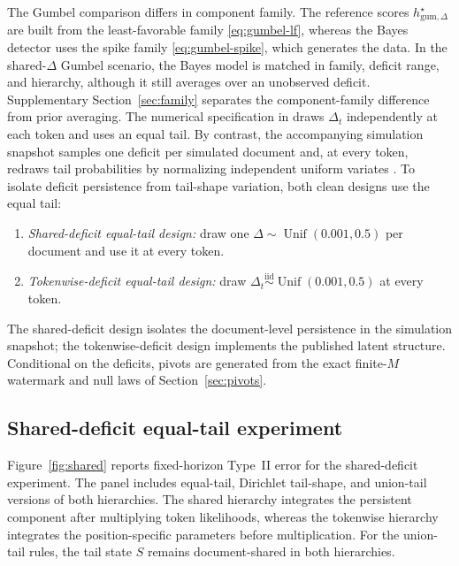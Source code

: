 \documentclass[11pt]{article}
\newcommand{\Unif}{\operatorname{Unif}}
\begin{document}
The Gumbel comparison differs in component family.  The reference scores $h_{\mathrm{gum},\Delta}^\star$ are built from the least-favorable family \eqref{eq:gumbel-lf}, whereas the Bayes detector uses the spike family \eqref{eq:gumbel-spike}, which generates the data.  In the shared-$\Delta$ Gumbel scenario, the Bayes model is matched in family, deficit range, and hierarchy, although it still averages over an unobserved deficit.  Supplementary Section~\ref{sec:family} separates the component-family difference from prior averaging.  The numerical specification in \citet{li2025framework} draws $\Delta_t$ independently at each token and uses an equal tail.  By contrast, the accompanying simulation snapshot samples one deficit per simulated document and, at every token, redraws tail probabilities by normalizing independent uniform variates \citep{li2024watermarkframework}.  To isolate deficit persistence from tail-shape variation, both clean designs use the equal tail:
\begin{enumerate}
  \setlength{\itemsep}{0pt}
  \setlength{\parsep}{0pt}
  \item \emph{Shared-deficit equal-tail design:} draw one $\Delta\sim\Unif(0.001,0.5)$ per document and use it at every token.
  \item \emph{Tokenwise-deficit equal-tail design:} draw $\Delta_t\stackrel{\mathrm{iid}}{\sim}\Unif(0.001,0.5)$ at every token.
\end{enumerate}
The shared-deficit design isolates the document-level persistence in the simulation snapshot; the tokenwise-deficit design implements the published latent structure.  Conditional on the deficits, pivots are generated from the exact finite-$M$ watermark and null laws of Section~\ref{sec:pivots}.

\FloatBarrier
\subsection{Shared-deficit equal-tail experiment}
\label{sec:shared-sensitivity}

Figure~\ref{fig:shared} reports fixed-horizon Type~II error for the shared-deficit experiment.  The panel includes equal-tail, Dirichlet tail-shape, and union-tail versions of both hierarchies.  The shared hierarchy integrates the persistent component after multiplying token likelihoods, whereas the tokenwise hierarchy integrates the position-specific parameters before multiplication.  For the union-tail rules, the tail state $S$ remains document-shared in both hierarchies.
\end{document}
